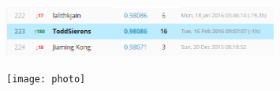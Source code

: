 \begin{frame}[plain]
\begin{figure}
\includegraphics[width = 0.8\textwidth]{kaggle_leaderboard}
\end{figure}
\end{frame}

\begin{frame}[plain]
\begin{figure}
\texttt{[image: photo]}
\end{figure}

\end{frame}

